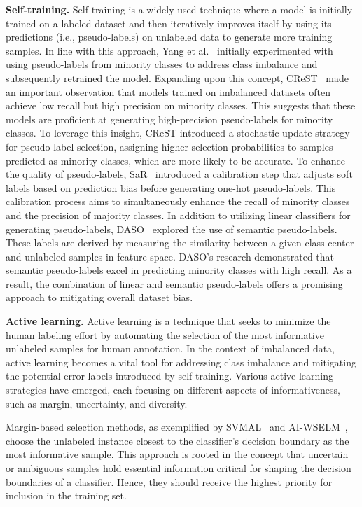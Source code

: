 \textbf{Self-training.}
Self-training is a widely used technique where a model is initially trained on a labeled dataset and then iteratively improves itself by using its predictions (i.e., pseudo-labels) on unlabeled data to generate more training samples. In line with this approach, Yang et al.~\cite{yang2020rethinking} initially experimented with using pseudo-labels from minority classes to address class imbalance and subsequently retrained the model.
Expanding upon this concept, CReST~\cite{wei2021crest} made an important observation that models trained on imbalanced datasets often achieve low recall but high precision on minority classes. This suggests that these models are proficient at generating high-precision pseudo-labels for minority classes. To leverage this insight, CReST introduced a stochastic update strategy for pseudo-label selection, assigning higher selection probabilities to samples predicted as minority classes, which are more likely to be accurate.
To enhance the quality of pseudo-labels, SaR~\cite{Lai_2022_CVPR} introduced a calibration step that adjusts soft labels based on prediction bias before generating one-hot pseudo-labels. This calibration process aims to simultaneously enhance the recall of minority classes and the precision of majority classes.
In addition to utilizing linear classifiers for generating pseudo-labels, DASO~\cite{oh2022daso} explored the use of semantic pseudo-labels. These labels are derived by measuring the similarity between a given class center and unlabeled samples in feature space. DASO's research demonstrated that semantic pseudo-labels excel in predicting minority classes with high recall. As a result, the combination of linear and semantic pseudo-labels offers a promising approach to mitigating overall dataset bias.


\textbf{Active learning.}
Active learning is a technique that seeks to minimize the human labeling effort by automating the selection of the most informative unlabeled samples for human annotation. In the context of imbalanced data, active learning becomes a vital tool for addressing class imbalance and mitigating the potential error labels introduced by self-training. Various active learning strategies have emerged, each focusing on different aspects of informativeness, such as margin, uncertainty, and diversity.

Margin-based selection methods, as exemplified by SVMAL~\cite{ertekin2007active} and AI-WSELM~\cite{qin2021active}, choose the unlabeled instance closest to the classifier's decision boundary as the most informative sample. This approach is rooted in the concept that uncertain or ambiguous samples hold essential information critical for shaping the decision boundaries of a classifier. Hence, they should receive the highest priority for inclusion in the training set.

